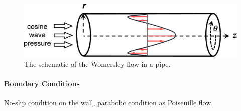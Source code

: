 \documentclass[a4paper]{article}
\begin{document}
\vspace{-.5cm}
\begin{figure}[H]
    \centering
    \includegraphics[width=.7\textwidth]{img/wo-pipe.eps}
    \caption{The schematic of the Womersley flow in a pipe.}
\end{figure}

\paragraph{Boundary Conditions} No-slip condition on the wall, parabolic condition as Poiseuille flow.
\end{document}
